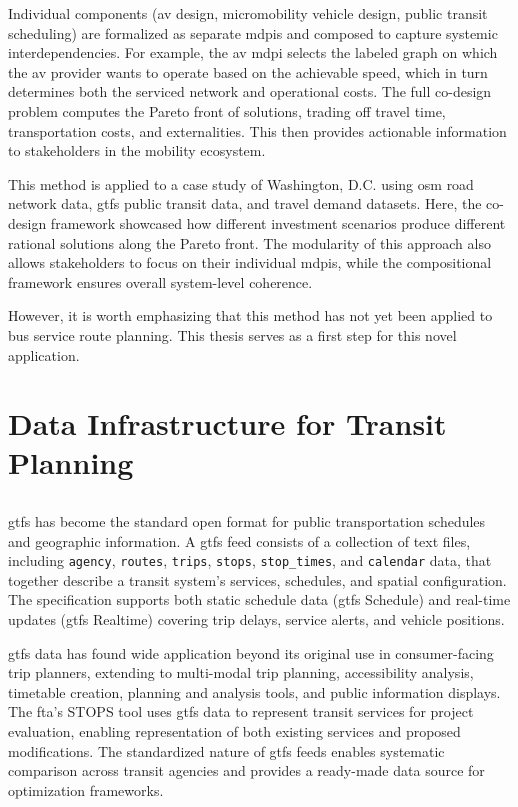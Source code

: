 Individual components (\gls{av} design, micromobility vehicle design, public transit scheduling) are formalized as separate \glspl{mdpi} and composed to capture systemic interdependencies. For example, the \gls{av} \gls{mdpi} selects the labeled graph on which the \gls{av} provider wants to operate based on the achievable speed, which in turn determines both the serviced network and operational costs. The full co-design problem computes the Pareto front of solutions, trading off travel time, transportation costs, and externalities. This then provides actionable information to stakeholders in the mobility ecosystem.

This method is applied to a case study of Washington, D.C. using \gls{osm} road network data, \gls{gtfs} public transit data, and travel demand datasets. Here, the co-design framework showcased how different investment scenarios produce different rational solutions along the Pareto front. The modularity of this approach also allows stakeholders to focus on their individual \glspl{mdpi}, while the compositional framework ensures overall system-level coherence.

However, it is worth emphasizing that this method has not yet been applied to bus service route planning. This thesis serves as a first step for this novel application.

\section{Data Infrastructure for Transit Planning}
\subsection{}

\Gls{gtfs} \cite{Overview} has become the standard open format for public transportation schedules and geographic information. A \gls{gtfs} feed consists of a collection of text files, including \verb!agency!, \verb!routes!, \verb!trips!, \verb!stops!, \verb!stop_times!, and \verb!calendar! data, that together describe a transit system's services, schedules, and spatial configuration. The specification supports both static schedule data (\gls{gtfs} Schedule) and real-time updates (\gls{gtfs} Realtime) covering trip delays, service alerts, and vehicle positions.

\Gls{gtfs} data has found wide application beyond its original use in consumer-facing trip planners, extending to multi-modal trip planning, accessibility analysis, timetable creation, planning and analysis tools, and public information displays. The \gls{fta}'s STOPS tool uses \gls{gtfs} data to represent transit services for project evaluation, enabling representation of both existing services and proposed modifications. The standardized nature of \gls{gtfs} feeds enables systematic comparison across transit agencies and provides a ready-made data source for optimization frameworks. \cite{nchrp08-119General, 2019STOPS}

